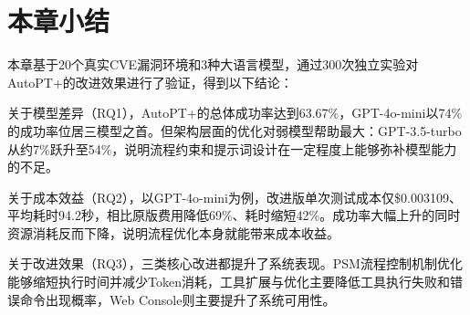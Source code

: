 \section{本章小结}

本章基于20个真实CVE漏洞环境和3种大语言模型，通过300次独立实验对AutoPT+的改进效果进行了验证，得到以下结论：

关于模型差异（RQ1），AutoPT+的总体成功率达到63.67\%，GPT-4o-mini以74\%的成功率位居三模型之首。但架构层面的优化对弱模型帮助最大：GPT-3.5-turbo从约7\%跃升至54\%，说明流程约束和提示词设计在一定程度上能够弥补模型能力的不足。

关于成本效益（RQ2），以GPT-4o-mini为例，改进版单次测试成本仅\$0.003109、平均耗时94.2秒，相比原版费用降低69\%、耗时缩短42\%。成功率大幅上升的同时资源消耗反而下降，说明流程优化本身就能带来成本收益。

关于改进效果（RQ3），三类核心改进都提升了系统表现。PSM流程控制机制优化能够缩短执行时间并减少Token消耗，工具扩展与优化主要降低工具执行失败和错误命令出现概率，Web Console则主要提升了系统可用性。
